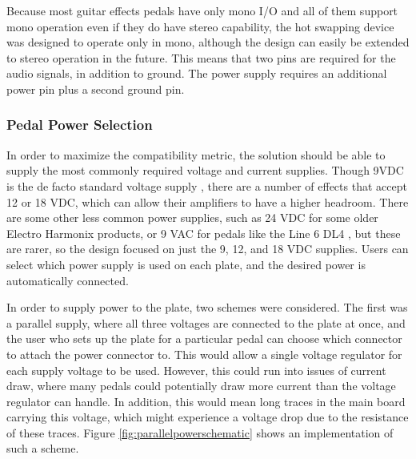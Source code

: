 		Because most guitar effects pedals have only mono I/O and all of them support mono operation even if they do have stereo capability, the hot swapping device was designed to operate only in mono, although the design can easily be extended to stereo operation in the future.  This means that two pins are required for the audio signals, in addition to ground.  The power supply requires an additional power pin plus a second ground pin.

		\subsubsection{Pedal Power Selection}

		In order to maximize the compatibility metric, the solution should be able to supply the most commonly required voltage and current supplies.  Though 9VDC is the de facto standard voltage supply \cite{MyPedalData}, there are a number of effects that accept 12 or 18 VDC, which can allow their amplifiers to have a higher headroom.  There are some other less common power supplies, such as 24 VDC for some older Electro Harmonix products, or 9 VAC for pedals like the Line 6 DL4 \cite{Line6DL4manual}, but these are rarer, so the design focused on just the 9, 12, and 18 VDC supplies.  Users can select which power supply is used on each plate, and the desired power is automatically connected.

		In order to supply power to the plate, two schemes were considered.  The first was a parallel supply, where all three voltages are connected to the plate at once, and the user who sets up the plate for a particular pedal can choose which connector to attach the power connector to.  This would allow a single voltage regulator for each supply voltage to be used.  However, this could run into issues of current draw, where many pedals could potentially draw more current than the voltage regulator can handle.  In addition, this would mean long traces in the main board carrying this voltage, which might experience a voltage drop due to the resistance of these traces.  Figure \ref{fig:parallelpowerschematic} shows an implementation of such a scheme.


